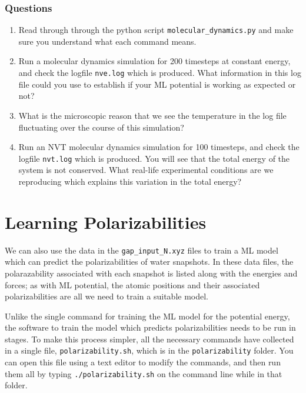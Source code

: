\documentclass{article}
\begin{document}
\subsubsection*{Questions}

\begin{enumerate}

\item Read through through the python script \verb|molecular_dynamics.py| and make sure you understand what each command means.
\item Run a molecular dynamics simulation for 200 timesteps at constant energy, and check the logfile \verb|nve.log| which is produced. What information in this log file could you use to establish if your ML potential is working as expected or not?
\item What is the microscopic reason that we see the temperature in the log file fluctuating over the course of this simulation?
\item Run an NVT molecular dynamics simulation for 100 timesteps, and check the logfile \verb|nvt.log| which is produced. You will see that the total energy of the system is not conserved. What real-life experimental conditions are we reproducing which explains this variation in the total energy?

\end{enumerate}

\section{Learning Polarizabilities}

We can also use the data in the \verb|gap_input_N.xyz| files to train a ML model which can predict the polarizabilities of water snapshots. In these data files, the polarazability associated with each snapshot is listed along with the energies and forces; as with ML potential, the atomic positions and their associated polarizabilities are all we need to train a suitable model.

Unlike the single command for training the ML model for the potential energy, the software to train the model which predicts polarizabilities needs to be run in stages. To make this process simpler, all the necessary commands have collected in a single file, \verb|polarizability.sh|, which is in the \verb|polarizability| folder. You can open this file using a text editor to modify the commands, and then run them all by typing \verb|./polarizability.sh| on the command line while in that folder.
\end{document}
